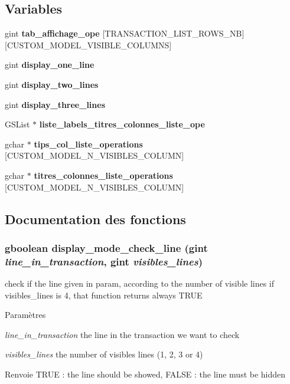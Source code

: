 \subsection*{Variables}
\begin{DoxyCompactItemize}
\item 
gint {\bf tab\_\-affichage\_\-ope} [TRANSACTION\_\-LIST\_\-ROWS\_\-NB][CUSTOM\_\-MODEL\_\-VISIBLE\_\-COLUMNS]
\item 
gint {\bf display\_\-one\_\-line}
\item 
gint {\bf display\_\-two\_\-lines}
\item 
gint {\bf display\_\-three\_\-lines}
\item 
GSList $\ast$ {\bf liste\_\-labels\_\-titres\_\-colonnes\_\-liste\_\-ope}
\item 
gchar $\ast$ {\bf tips\_\-col\_\-liste\_\-operations} [CUSTOM\_\-MODEL\_\-N\_\-VISIBLES\_\-COLUMN]
\item 
gchar $\ast$ {\bf titres\_\-colonnes\_\-liste\_\-operations} [CUSTOM\_\-MODEL\_\-N\_\-VISIBLES\_\-COLUMN]
\end{DoxyCompactItemize}


\subsection{Documentation des fonctions}
\subsubsection[{display\_\-mode\_\-check\_\-line}]{\setlength{\rightskip}{0pt plus 5cm}gboolean display\_\-mode\_\-check\_\-line (gint {\em line\_\-in\_\-transaction}, \/  gint {\em visibles\_\-lines})}\label{affichage__liste_8c_a29ff0d6bb71d4f22c3cfb6fc8d58d0a3}
check if the line given in param, according to the number of visible lines if visibles\_\-lines is 4, that function returns always TRUE


\begin{DoxyParams}{Paramètres}
\item[{\em line\_\-in\_\-transaction}]the line in the transaction we want to check \item[{\em visibles\_\-lines}]the number of visibles lines (1, 2, 3 or 4)\end{DoxyParams}
\begin{DoxyReturn}{Renvoie}
TRUE : the line should be showed, FALSE : the line must be hidden 
\end{DoxyReturn}



